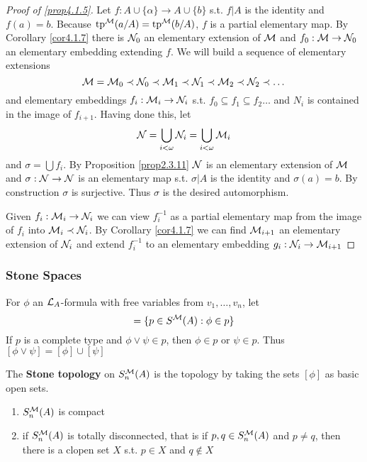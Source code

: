 \documentclass[11pt]{article}
\begin{document}
\begin{proof}[Proof of \ref{prop4.1.5}]
Let \(f:A\cup\{\alpha\}\to A\cup\{b\}\) s.t. \(f|A\) is the identity and \(f(a)=b\).
Because \(\operatorname{tp}^{\mathcal{M}}(a/A)=\operatorname{tp}^{\mathcal{M}}(b/A)\), \(f\) is a partial elementary map. By Corollary
\ref{cor4.1.7} there is \(\mathcal{N}_0\) an elementary extension of \(\mathcal{M}\) and \(f_0:\mathcal{M}\to\mathcal{N}_0\) an elementary
embedding extending \(f\).  We will build a sequence of elementary extensions
\begin{equation*}
\mathcal{M}=\mathcal{M}_0\prec\mathcal{N}_0\prec\mathcal{M}_1\prec\mathcal{N}_1\prec\mathcal{M}_2\prec\mathcal{N}_2\prec\dots
\end{equation*}
and elementary embeddings \(f_i:\mathcal{M}_i\to\mathcal{N}_i\) s.t. \(f_0\subseteq f_1\subseteq f_2\dots\) and \(N_i\) is contained in the
image of \(f_{i+1}\). Having done this, let
\begin{equation*}
\mathcal{N}=\bigcup_{i<\omega}\mathcal{N}_i=\bigcup_{i<\omega}\mathcal{M}_i
\end{equation*}
and \(\sigma=\bigcup f_i\). By Proposition \ref{prop2.3.11} \(\mathcal{N}\) is an elementary extension of \(\mathcal{M}\)
and \(\sigma:\mathcal{N}\to\mathcal{N}\) is an elementary map s.t. \(\sigma|A\) is the identity and \(\sigma(a)=b\). By construction
\(\sigma\) is surjective. Thus \(\sigma\) is the desired automorphism.

Given \(f_i:\mathcal{M}_i\to\mathcal{N}_i\) we can view \(f_i^{-1}\) as a partial elementary map from the image of \(f_i\)
into \(\mathcal{M}_i\prec\mathcal{N}_i\). By Corollary \ref{cor4.1.7} we can find \(\mathcal{M}_{i+1}\) an elementary extension
of \(\mathcal{N}_i\) and extend \(f_i^{-1}\) to an elementary embedding \(g_i:\mathcal{N}_i\to\mathcal{M}_{i+1}\)
\end{proof}

\subsubsection{Stone Spaces}
\label{sec:orgcec8ea8}
For \(\phi\) an \(\mathcal{L}_A\)-formula with free variables from \(v_1,\dots,v_n\), let
\begin{equation*}
[\phi]=\{p\in S^{\calm}(A):\phi\in p\}
\end{equation*}
If \(p\) is a complete type and \(\phi\vee\psi\in p\), then \(\phi\in p\) or \(\psi\in p\). Thus
\([\phi\vee\psi]=[\phi]\cup[\psi]\)

The \textbf{Stone topology} on \(S_n^{\mathcal{M}}(A)\) is the topology by taking the sets \([\phi]\) as basic open
sets.

\begin{lemma}[]
\begin{enumerate}
\item \(S_n^{\mathcal{M}}(A)\) is compact
\item if \(S_n^{\mathcal{M}}(A)\) is totally disconnected, that is if \(p,q\in S_n^{\mathcal{M}}(A)\) and \(p\neq q\), then
there is a clopen set \(X\) s.t. \(p\in X\) and \(q\not\in X\)
\end{enumerate}
\end{lemma}
\end{document}
